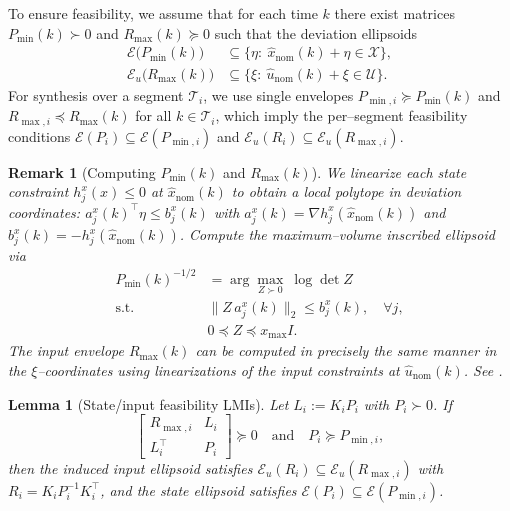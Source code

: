 \documentclass[letterpaper, 10 pt, conference]{ieeeconf}
\newtheorem{remark}{Remark}
\newtheorem{lemma}{Lemma}
\begin{document}
To ensure feasibility, we assume that for each time $k$ there exist matrices
$P_{\min}(k)\!\succ\!0$ and $R_{\max}(k)\!\succeq\!0$ such that the deviation
ellipsoids
\begin{align*}
    \mathcal{E}\!\big(P_{\min}(k)\big)&\subseteq
\{\eta:\ \hat x_{\mathrm{nom}}(k)+\eta\in\mathcal X\},\\
\mathcal{E}_u\!\big(R_{\max}(k)\big)&\subseteq
\{\xi:\ \hat u_{\mathrm{nom}}(k)+\xi\in\mathcal U\}.
\end{align*}
For synthesis over a segment $\mathcal{T}_i$, we use single envelopes
$P_{\min,i}\!\succeq\!P_{\min}(k)$ and $R_{\max,i}\!\preceq\!R_{\max}(k)$ for all
$k\in\mathcal{T}_i$, which imply the per–segment feasibility conditions
$\mathcal{E}(P_i)\subseteq\mathcal{E}(P_{\min,i})$ and
$\mathcal{E}_u(R_i)\subseteq\mathcal{E}_u(R_{\max,i})$.
\begin{remark}[Computing $P_{\min}(k)$ and $R_{\max}(k)$]\label{rem:mvie}
We linearize each state constraint $h^x_j(x)\le 0$ at $\hat x_{\mathrm{nom}}(k)$ to obtain a local polytope in deviation coordinates:
$a^x_j(k)^\top \eta \le b^x_j(k)$ with
$a^x_j(k)=\nabla h^x_j(\hat x_{\mathrm{nom}}(k))$ and $b^x_j(k)=-h^x_j(\hat x_{\mathrm{nom}}(k))$.
Compute the maximum–volume inscribed ellipsoid via
\begin{align*}
P_{\min}(k)^{-1/2}
  &= \arg\max_{Z \succ 0}\ \log\det Z \\
\text{s.t.}\quad
  & \|Z\,a^x_j(k)\|_2 \le b^x_j(k), \quad \forall j,\\
  & 0 \preceq Z \preceq x_{\max} I.
\end{align*}
The input envelope $R_{\max}(k)$ can be computed in precisely the same manner in the $\xi$–coordinates using linearizations of the input constraints at $\hat u_{\mathrm{nom}}(k)$. See \cite{Boyd2004,Reynolds2020}.
\end{remark}

\begin{lemma}[State/input feasibility LMIs]\label{lem:feasibility_lmis}
Let $L_i:=K_iP_i$ with $P_i\succ0$. If
\[
\begin{bmatrix} R_{\max,i} & L_i\\ L_i^\top & P_i \end{bmatrix} \succeq 0
\quad\text{and}\quad
P_i \succeq P_{\min,i},
\]
then the induced input ellipsoid satisfies $\mathcal{E}_u(R_i)\subseteq\mathcal{E}_u(R_{\max,i})$ with $R_i=K_iP_i^{-1}K_i^\top$, and the state ellipsoid satisfies $\mathcal{E}(P_i)\subseteq\mathcal{E}(P_{\min,i})$.
\end{lemma}
\end{document}
